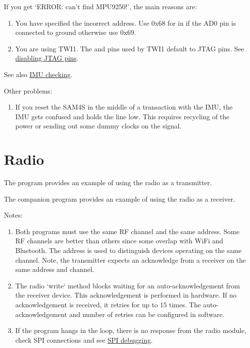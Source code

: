 If you get `ERROR: can't find MPU9250!', the main reasons are:

\begin{enumerate}
\item
  You have specified the incorrect address.  Use 0x68 for
   in  if the AD0 pin is connected to
  ground otherwise use 0x69.
\item
  You are using TWI1. The  and  pins used by TWI1
  default to JTAG pins. See
  \protect\hyperref[disabling-jtag-pins]{disabling JTAG pins}.
\end{enumerate}
%
See also \protect\hyperref[checking-IMU]{IMU checking}.

Other problems:
%
\begin{enumerate}
\item If you reset the SAM4S in the middle of a transaction with the
IMU, the IMU gets confused and holds the  line low. This
requires recycling of the power or sending out some dummy clocks on
the  signal.
\end{enumerate}


\section{Radio}
\label{radio-test}

The program  provides
an example of using the radio as a transmitter.

The companion program
 provides an example
of using the radio as a receiver.

Notes:
%
\begin{enumerate}
\item
  Both programs must use the same RF channel and the same address. Some
  RF channels are better than others since some overlap with WiFi
  and Bluetooth. The address is used to distinguish devices
  operating on the same channel. Note, the transmitter expects an
  acknowledge from a receiver on the same address and channel.
\item
  The radio `write` method blocks waiting for an auto-acknowledgement
  from the receiver device. This acknowledgement is performed in
  hardware. If no acknowledgement is received, it retries for up to 15
  times. The auto-acknowledgement and number of retries can be
  configured in software.

\item If the program hangs in the  loop, there is no
  response from the radio module, check SPI connections and see
  \hyperref[debugging_Spi]{SPI debugging}.
  
\end{enumerate}

